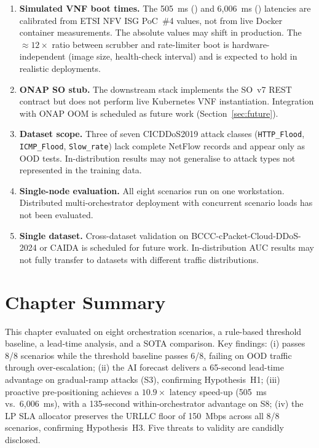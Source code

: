 \begin{enumerate}
  \item \textbf{Simulated VNF boot times.} The 505~ms () and
        6{,}006~ms () latencies are calibrated from ETSI NFV ISG
        PoC~\#4 values, not from live Docker container measurements. The
        absolute values may shift in production. The $\approx 12\times$
        ratio between scrubber and rate-limiter boot is hardware-independent
        (image size, health-check interval) and is expected to hold in
        realistic deployments.

  \item \textbf{ONAP SO stub.} The downstream stack implements the SO~v7
        REST contract but does not perform live Kubernetes VNF instantiation.
        Integration with ONAP OOM is scheduled as future work
        (Section~\ref{sec:future}).

  \item \textbf{Dataset scope.} Three of seven CICDDoS2019 attack classes
        (\texttt{HTTP\_Flood}, \texttt{ICMP\_Flood}, \texttt{Slow\_rate})
        lack complete NetFlow records and appear only as OOD tests.
        In-distribution results may not generalise to attack types not
        represented in the training data.

  \item \textbf{Single-node evaluation.} All eight scenarios run on one
        workstation. Distributed multi-orchestrator deployment with
        concurrent scenario loads has not been evaluated.

  \item \textbf{Single dataset.} Cross-dataset validation on
        BCCC-cPacket-Cloud-DDoS-2024 or CAIDA is scheduled for future work.
        In-distribution AUC results may not fully transfer to datasets
        with different traffic distributions.
\end{enumerate}

\section{Chapter Summary}
\label{sec:eval-summary}

This chapter evaluated \padonap{} on eight orchestration scenarios,
a rule-based threshold baseline, a lead-time analysis, and a SOTA
comparison. Key findings: (i) \padonap{} passes 8/8 scenarios while
the threshold baseline passes 6/8, failing on OOD traffic through
over-escalation; (ii) the AI forecast delivers a 65-second lead-time
advantage on gradual-ramp attacks (S3), confirming Hypothesis~H1;
(iii) proactive pre-positioning achieves a $10.9\times$ latency
speed-up (505~ms vs.\ 6{,}006~ms), with a 135-second within-orchestrator
advantage on S8; (iv) the LP SLA allocator preserves the URLLC floor
of 150~Mbps across all 8/8 scenarios, confirming Hypothesis~H3.
Five threats to validity are candidly disclosed.
